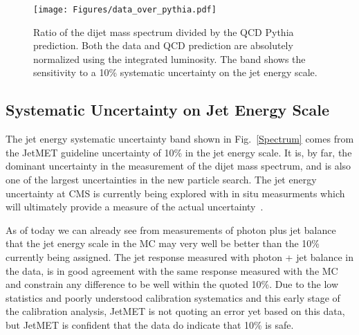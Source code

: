 \begin{figure}[!ht]
  \begin{center}
   \texttt{[image: Figures/data\_over\_pythia.pdf]}
    \caption{ Ratio of the dijet mass spectrum divided by the QCD Pythia prediction. Both the
    data and QCD prediction are absolutely normalized using the integrated luminosity.
    The band shows the sensitivity to a 10\% systematic uncertainty on the jet energy scale.}
    \label{DataOverPythia}
  \end{center}
\end{figure}


\clearpage

\subsection{Systematic Uncertainty on Jet Energy Scale}
\label{JESerror}
The jet energy systematic uncertainty band shown in Fig.~\ref{Spectrum} comes
from the JetMET guideline uncertainty of 10\% in the jet energy scale.
It is, by far, the dominant uncertainty in the measurement of the dijet
mass spectrum, and is also one of the largest uncertainties in the new particle
search.  The jet energy uncertainty at CMS is currently being explored with
in situ measurments which will ultimately provide a measure 
of the actual uncertainty~\cite{PAS_JME_07-002}.


As of today we can already see 
from measurements of photon plus jet balance~\cite{PAS_JME_10-003, CMS_AN_2010/141}
that the jet energy scale in the MC may very well be better than the 10\% currently being assigned. 
The jet response measured with photon + jet balance in the data, 
is in good agreement with the same response measured with the MC~\cite{PAS_JME_10-003} and constrain 
any difference to be well within the quoted 10\%. Due to the low statistics and
poorly understood calibration systematics and this early stage of the calibration analysis, JetMET
is not quoting an error yet based on this data, but JetMET is confident that the data do
indicate that 10\% is safe. 


